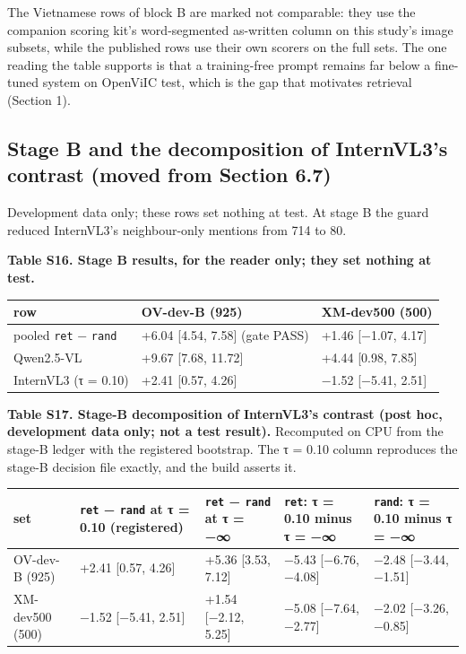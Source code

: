 \documentclass[manuscript,screen]{acmart}
\begin{document}
The Vietnamese rows of block B are marked not comparable: they use the companion scoring kit's
word-segmented as-written column on this study's image subsets, while the published rows use their
own scorers on the full sets. The one reading the table supports is that a training-free prompt
remains far below a fine-tuned system on OpenViIC test, which is the gap that motivates retrieval
(Section 1).

\subsection{Stage B and the decomposition of InternVL3's contrast (moved from Section
6.7)}\label{stage-b-and-the-decomposition-of-internvl3s-contrast-moved-from-section-6.7}

Development data only; these rows set nothing at test. At stage B the guard reduced InternVL3's
neighbour-only mentions from 714 to 80.

\textbf{Table S16. Stage B results, for the reader only; they set nothing at test.}

\begin{longtable}[]{@{}lll@{}}
\toprule\noalign{}
row & OV-dev-B (925) & XM-dev500 (500) \\
\midrule\noalign{}
\endhead
\bottomrule\noalign{}
\endlastfoot
pooled \texttt{ret} − \texttt{rand} & +6.04 {[}4.54, 7.58{]} (gate PASS) & +1.46 {[}−1.07,
4.17{]} \\
Qwen2.5-VL & +9.67 {[}7.68, 11.72{]} & +4.44 {[}0.98, 7.85{]} \\
InternVL3 (τ = 0.10) & +2.41 {[}0.57, 4.26{]} & −1.52 {[}−5.41, 2.51{]} \\
\end{longtable}

\textbf{Table S17. Stage-B decomposition of InternVL3's contrast (post hoc, development data only;
not a test result).} Recomputed on CPU from the stage-B ledger with the registered bootstrap. The τ
= 0.10 column reproduces the stage-B decision file exactly, and the build asserts it.

\begin{longtable}[]{@{}
  >{\raggedright\arraybackslash}p{}
  >{\raggedright\arraybackslash}p{}
  >{\raggedright\arraybackslash}p{}
  >{\raggedright\arraybackslash}p{}
  >{\raggedright\arraybackslash}p{}@{}}
\toprule\noalign{}
set & \texttt{ret} − \texttt{rand} at τ = 0.10 (registered) & \texttt{ret} − \texttt{rand} at τ = −∞ & \texttt{ret}: τ = 0.10 minus τ = −∞ & \texttt{rand}: τ = 0.10 minus τ = −∞ \\
\midrule\noalign{}
\endhead
\bottomrule\noalign{}
\endlastfoot
OV-dev-B (925) & +2.41 {[}0.57, 4.26{]} & +5.36 {[}3.53, 7.12{]} & −5.43 {[}−6.76, −4.08{]} & −2.48
{[}−3.44, −1.51{]} \\
XM-dev500 (500) & −1.52 {[}−5.41, 2.51{]} & +1.54 {[}−2.12, 5.25{]} & −5.08 {[}−7.64, −2.77{]} &
−2.02 {[}−3.26, −0.85{]} \\
\end{longtable}
\end{document}
